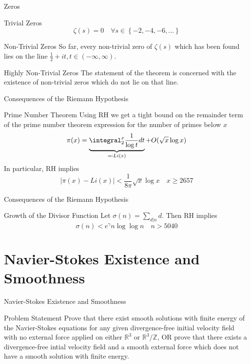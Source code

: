 \documentclass[handout]{beamer}
\newcommand{\Real}{\mathbb{R}}
\newcommand{\Integer}{\mathbb{Z}}
\begin{document}
  \begin{frame}{Zeros}
      \begin{block}{Trivial Zeros}
          $$
          \zeta(s) = 0 \quad \forall s \in \left\{-2, -4, -6, \ldots \right\}
          $$
      \end{block}
      \pause
      \begin{block}{Non-Trivial Zeros}
          So far, every non-trivial zero of $\zeta(s)$ which has been found
          lies on the line $\frac{1}{2} + it, t \in (-\infty, \infty)$.
      \end{block}
      \pause
      \begin{block}{Highly Non-Trivial Zeros}
          The statement of the theorem is concerned with the existence of
          non-trivial zeros which do not lie on that line.
      \end{block}
  \end{frame}
  \begin{frame}{Consequences of the Riemann Hypothesis}
      \begin{block}{Prime Number Theorem}
          Using RH we get a tight bound on the remainder term of the prime
          number theorem expression for the number of primes below $x$
          $$
          \pi(x) = \underbrace{\integral_{2}^{x} \frac{1}{\log t}
          dt}_{\eqqcolon Li(x)} + O(\sqrt{x}\log x)
          $$
          In particular, RH implies
          $$
          \left| \pi(x) - Li(x) \right| < \frac{1}{8\pi}\sqrt{x}\log x \quad
          x \ge 2657
          $$
      \end{block}
  \end{frame}
  \begin{frame}{Consequences of the Riemann Hypothesis}
      \begin{block}{Growth of the Divisor Function}
          Let $\sigma(n) = \sum_{d | n}d$. Then RH implies
          $$
          \sigma(n) < e^{\gamma} n \log\log n \quad n > 5040
          $$
      \end{block}
  \end{frame}

  \section{Navier-Stokes Existence and Smoothness}
  \begin{frame}{Navier-Stokes Existence and Smoothness}
      \begin{block}{Problem Statement}
          Prove that there exist smooth solutions with finite energy of the
          Navier-Stokes equations for any given divergence-free initial
          velocity field with no external force applied on either $\Real^3$
          or $\Real^3/\Integer$, OR prove that there exists a divergence-free
          intial velocity field and a smooth external force which does not
          have a smooth solution with finite energy.
      \end{block}
  \end{frame}
\end{document}
